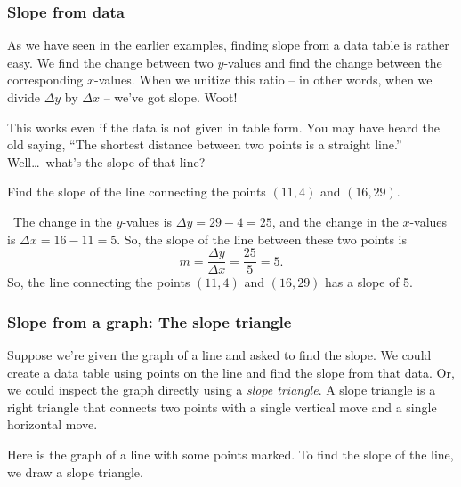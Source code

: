 \subsubsection{Slope from data}

As we have seen in the earlier examples, finding slope from a data table is rather easy. We find the change between two $y$-values and find the change between the corresponding $x$-values. When we unitize this ratio -- in other words, when we divide $\Delta y$ by $\Delta x$ -- we've got slope. Woot!

This works even if the data is not given in table form. You may have heard the old saying, ``The shortest distance between two points is a straight line.'' Well\ldots\ what's the slope of that line?

\begin{boxex}
Find the slope of the line connecting the points $(11, 4)$ and $(16, 29)$.

\exsoln\ The change in the $y$-values is $\Delta y = 29-4 = 25$, and the change in the $x$-values is $\Delta x = 16-11=5$. So, the slope of the line between these two points is \[m = \frac{\Delta y}{\Delta x} = \frac{25}{5} = 5.\]
So, the line connecting the points $(11, 4)$ and $(16, 29)$ has a slope of 5.
\end{boxex}

\subsubsection{Slope from a graph: The slope triangle}

Suppose we're given the graph of a line and asked to find the slope. We could create a data table using points on the line and find the slope from that data. Or, we could inspect the graph directly using a \textit{slope triangle}. A slope triangle is a right triangle that connects two points with a single vertical move and a single horizontal move.

Here is the graph of a line with some points marked. To find the slope of the line, we draw a slope triangle.


